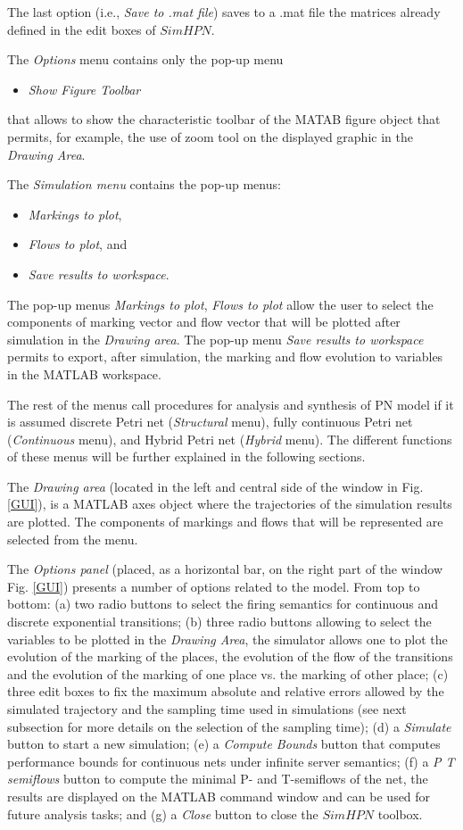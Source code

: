 The last option (i.e., \emph{Save to .mat file}) saves to a .mat file the matrices already defined in the edit boxes of $SimHPN$.

The {\color{blue}\emph{Options}} menu contains only the pop-up menu 
\begin{itemize}
\item \emph{Show Figure Toolbar} 
\end{itemize}
that allows to show the characteristic toolbar of the MATAB figure object that permits, for example, the use of zoom tool on the displayed graphic in the \emph{Drawing Area}.

The {\color{blue}\emph{Simulation menu}} contains the pop-up menus: 
\begin{itemize}
\item \emph{Markings to plot}, 
\item \emph{Flows to plot}, and 
\item \emph{Save results to workspace}. 
\end{itemize}
The pop-up menus \emph{Markings to plot}, \emph{Flows to plot} allow the user to select the components of marking vector and flow vector that will be plotted after  simulation in the \emph{Drawing area}. The pop-up menu \emph{Save results to workspace}  permits to export, after simulation, the marking and flow evolution to variables in the MATLAB workspace.

The rest of the menus call procedures for analysis and synthesis of PN model if it is assumed discrete Petri net (\emph{Structural} menu), fully continuous Petri net (\emph{Continuous} menu), and Hybrid Petri net (\emph{Hybrid} menu). The different functions of these menus will be further explained in the following sections.


The \emph{Drawing area} (located in the left and central side of the window in Fig. \ref{GUI}), is a MATLAB axes object where the trajectories of the simulation results are plotted. The components of markings and flows that will be represented are selected from the menu.

The \emph{Options panel} (placed, as a horizontal bar, on the right part of the window Fig. \ref{GUI}) presents a number of options related to the model. From top to bottom: (a) two radio buttons to select the firing semantics for continuous and discrete exponential  transitions; (b) three radio buttons allowing to select the variables to be plotted in the \emph{Drawing Area}, the simulator allows one to plot the evolution of the marking
of the places, the evolution of the flow of the transitions and
the evolution of the marking of one place vs. the marking of other
place; (c) three edit boxes to fix the maximum absolute and relative errors allowed by the simulated trajectory and the sampling time used in simulations (see next subsection for more details on the selection of the sampling time); (d) a \emph{Simulate} button to start a new simulation; (e) a \emph{Compute Bounds} button that computes performance bounds for continuous nets under infinite server semantics; (f) a \emph{P T semiflows} button to compute the minimal P- and T-semiflows of the net, the results are displayed on the MATLAB command window and can be used for future analysis tasks; and (g) a \emph{Close} button to close the $SimHPN$ toolbox.

